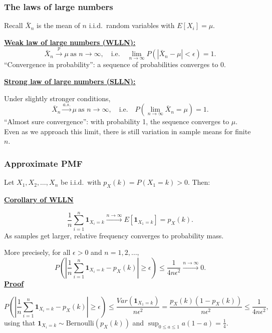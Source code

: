 \documentclass[t,8pt]{beamer}
\begin{document}
\begin{frame}
	\frametitle{The laws of large numbers}
	Recall $\bar X_n$ is the mean of $n$ i.i.d.\ random variables with $E[X_i]=\mu$. \par
	{\bf\underline{Weak law of large numbers (WLLN):}}
	\[
	\bar X_n\xrightarrow{p}\mu\ \text{as }n\rightarrow\infty,
	\quad\text{i.e.}\quad
	\lim_{n\rightarrow\infty}P\left(|\bar X_n-\mu|<\epsilon\right)=1.
	\]
	{\small\color{NavyBlue}
		``Convergence in probability'': a sequence of probabilities converges to 0.
	} \par
	{\bf\underline{Strong law of large numbers (SLLN):}} \par
	Under slightly stronger conditions,
	\[
	\bar X_n\xrightarrow{a.s.}\mu\ \text{as }n\rightarrow\infty,
	\quad\text{i.e.}\quad
	P\left(\lim_{n\rightarrow\infty}\bar X_n=\mu\right)=1.
	\]
	{\small\color{NavyBlue}
		``Almost sure convergence'': with probability 1, the sequence converges to $\mu$. \\
		Even as we approach this limit, there is still variation in sample means for finite $n$.
	}
\end{frame}

\begin{frame}
	\frametitle{Approximate PMF}
	Let $X_1,X_2,\dots,X_n$ be i.i.d.\ with $p_X(k)=P(X_1=k)>0$. Then: \par
	{\bf\underline{Corollary of WLLN}} \par
	\[
	\frac{1}{n}\sum_{i=1}^n\mathbf 1_{X_i=k}
	\xrightarrow{n\rightarrow\infty} E[\mathbf 1_{X_1=k}]
	=p_X(k).
	\]
	{\small\color{NavyBlue}
		As samples get larger, relative frequency converges to probability mass.
	} \par
	More precisely, for all $\epsilon>0$ and $n=1,2,\dots$,
	\[
	P\left(\left|\frac{1}{n}\sum_{i=1}^n\mathbf 1_{X_i=k}-p_X(k)\right|\geq\epsilon\right)
	\leq\frac{1}{4n\epsilon^2}\xrightarrow{n\rightarrow\infty}0.
	\]
	{\bf\underline{Proof}} \par
	\[
	P\left(\left|\frac{1}{n}\sum_{i=1}^n\mathbf 1_{X_i=k}-p_X(k)\right|\geq\epsilon\right)
	\leq\frac{Var(\mathbf 1_{X_1=k})}{n\epsilon^2}
	=\frac{p_X(k)(1-p_X(k))}{n\epsilon^2}
	\leq\frac{1}{4n\epsilon^2},
	\]
	using that $\mathbf 1_{X_i=k}\sim \mathrm{Bernoulli}(p_X(k))$ and $\sup_{0\leq a\leq 1}a(1-a)=\frac14$.
\end{frame}
\end{document}
